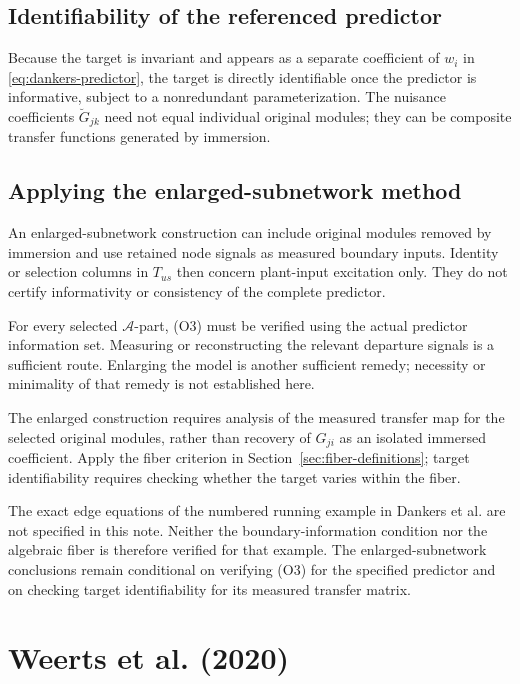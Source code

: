 \documentclass[11pt,a4paper]{article}
\newcommand{\Aset}{\mathcal A}
\begin{document}
\subsection{Identifiability of the referenced predictor}

Because the target is invariant and appears as a separate coefficient of $w_i$ in \eqref{eq:dankers-predictor}, the target is directly identifiable once the predictor is informative, subject to a nonredundant parameterization.  The nuisance coefficients $\breve G_{jk}$ need not equal individual original modules; they can be composite transfer functions generated by immersion.

\subsection{Applying the enlarged-subnetwork method}

An enlarged-subnetwork construction can include original modules removed by immersion and use retained node signals as measured boundary inputs.  Identity or selection columns in $T_{us}$ then concern plant-input excitation only.  They do not certify informativity or consistency of the complete predictor.

For every selected $\Aset$-part, (O3) must be verified using the actual predictor information set.  Measuring or reconstructing the relevant departure signals is a sufficient route.  Enlarging the model is another sufficient remedy; necessity or minimality of that remedy is not established here.

The enlarged construction requires analysis of the measured transfer map for the selected original modules, rather than recovery of $G_{ji}$ as an isolated immersed coefficient.  Apply the fiber criterion in Section~\ref{sec:fiber-definitions}; target identifiability requires checking whether the target varies within the fiber.

The exact edge equations of the numbered running example in Dankers et al. are not specified in this note.  Neither the boundary-information condition nor the algebraic fiber is therefore verified for that example.  The enlarged-subnetwork conclusions remain conditional on verifying (O3) for the specified predictor and on checking target identifiability for its measured transfer matrix.

\section{Weerts et al. (2020)}
\end{document}
